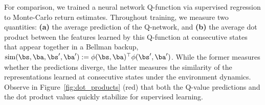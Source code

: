 For comparison, we trained a neural network Q-function via supervised regression to Monte-Carlo return estimates. Throughout training, we measure two quantities: \textbf{(a)} the average prediction of the Q-network, and \textbf{(b)} the average dot product between the features learned by this Q-function at consecutive states that appear together in a Bellman backup, $\text{sim}(\bs, \ba, \bs', \ba') := \phi(\bs, \ba)^\top \phi(\bs', \ba')$. While the former measures whether the predictions diverge, the latter measures the similarity of the representations learned at consecutive states under the environment dynamics. Observe in Figure~\ref{fig:dot_products} (red) that both the Q-value predictions and the dot product values quickly stabilize for supervised learning.

